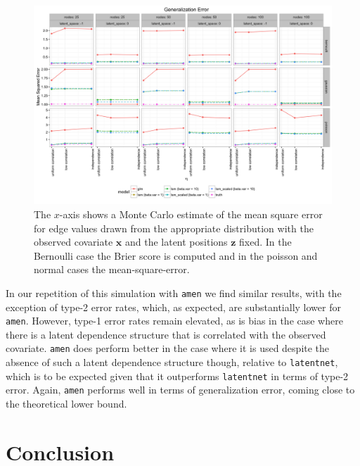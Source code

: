 \documentclass[11pt]{article}
\begin{document}
\begin{figure}
\includegraphics[width=\textwidth]{figures/generalization.png}
\caption{The $x$-axis shows a Monte Carlo estimate of the mean square error for edge values drawn from the appropriate distribution with the observed covariate $\mathbf{x}$ and the latent positions $\mathbf{z}$ fixed. In the Bernoulli case the Brier score is computed and in the poisson and normal cases the mean-square-error. \label{fig:generalization}}
\end{figure}

In our repetition of this simulation with \texttt{amen} we find similar results, with the exception of type-2 error rates, which, as expected, are substantially lower for \texttt{amen}. However, type-1 error rates remain elevated, as is bias in the case where there is a latent dependence structure that is correlated with the observed covariate. \texttt{amen} does perform better in the case where it is used despite the absence of such a latent dependence structure though, relative to \texttt{latentnet}, which is to be expected given that it outperforms \texttt{latentnet} in terms of type-2 error. Again, \texttt{amen} performs well in terms of generalization error, coming close to the theoretical lower bound.

\section{Conclusion}
\end{document}
